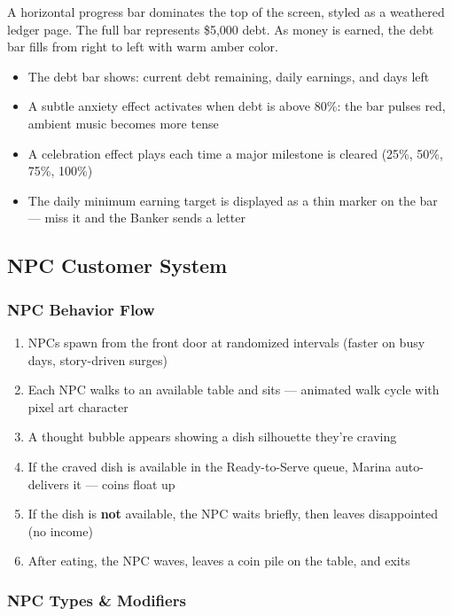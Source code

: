 \documentclass[11pt, letterpaper]{article}
\begin{document}
A horizontal progress bar dominates the top of the screen, styled as a weathered ledger page. The full bar represents \$5,000 debt. As money is earned, the debt bar fills from right to left with warm amber color.

\begin{itemize}
  \item The debt bar shows: current debt remaining, daily earnings, and days left
  \item A subtle anxiety effect activates when debt is above 80\%: the bar pulses red, ambient music becomes more tense
  \item A celebration effect plays each time a major milestone is cleared (25\%, 50\%, 75\%, 100\%)
  \item The daily minimum earning target is displayed as a thin marker on the bar --- miss it and the Banker sends a letter
\end{itemize}

\subsection{NPC Customer System}

\subsubsection{NPC Behavior Flow}
\begin{enumerate}
  \item NPCs spawn from the front door at randomized intervals (faster on busy days, story-driven surges)
  \item Each NPC walks to an available table and sits --- animated walk cycle with pixel art character
  \item A thought bubble appears showing a dish silhouette they're craving
  \item If the craved dish is available in the Ready-to-Serve queue, Marina auto-delivers it --- coins float up
  \item If the dish is \textbf{not} available, the NPC waits briefly, then leaves disappointed (no income)
  \item After eating, the NPC waves, leaves a coin pile on the table, and exits
\end{enumerate}

\subsubsection{NPC Types \& Modifiers}
\end{document}
